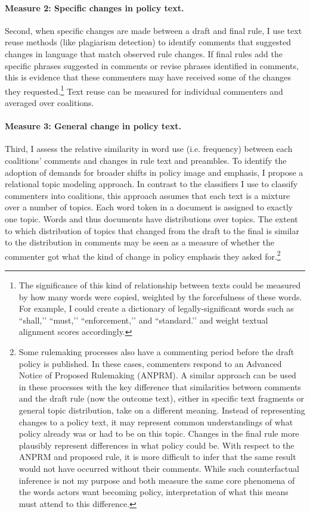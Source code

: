 \paragraph{Measure 2: Specific changes in policy text.} Second, when specific changes are made between a draft and final rule, I use text reuse methods (like plagiarism detection) to identify comments that suggested changes in language that match observed rule changes. %
If final rules add the specific phrases suggested in comments or revise phrases identified in comments, this is evidence that these commenters may have received some of the changes they requested.\footnote{The significance of this kind of relationship between texts could be measured by how many words were copied, weighted by the forcefulness of these words. For example, I could create a dictionary of legally-significant words such as ``shall,’’ ``must,’’ ``enforcement,’’ and ``standard.’’ and weight textual alignment scores accordingly.} Text reuse can be measured for individual commenters and averaged over coalitions.

\paragraph{Measure 3: General change in policy text.} Third, I assess the relative similarity in word use (i.e. frequency) between each coalitions' comments and changes in rule text and preambles. 
To identify the adoption of demands for broader shifts in policy image and emphasis, I propose a relational topic modeling approach. In contrast to the classifiers I use to classify commenters into coalitions, this approach assumes that each text is a mixture over a number of topics. Each word token in a document is assigned to exactly one topic. Words and thus documents have distributions over topics. The extent to which distribution of topics that changed from the draft to the final is similar to the distribution in comments may be seen as a measure of whether the commenter got what the kind of change in policy emphasis they asked for.\footnote{
Some rulemaking processes also have a commenting period before the draft policy is published. In these cases, commenters respond to an Advanced Notice of Proposed Rulemaking (ANPRM). A similar approach can be used in these processes with the key difference that similarities between comments and the draft rule (now the outcome text), either in specific text fragments or general topic distribution, take on a different meaning. Instead of representing changes to a policy text, it may represent common understandings of what policy already was or had to be on this topic. Changes in the final rule more plausibly represent differences in what policy could be. With respect to the ANPRM and proposed rule, it is more difficult to infer that the same result would not have occurred without their comments. While such counterfactual inference is not my purpose and both measure the same core phenomena of the words actors want becoming policy, interpretation of what this means must attend to this difference.}


